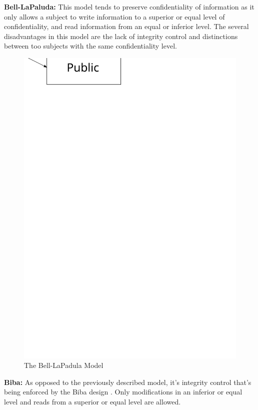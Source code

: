 \documentclass[pdftex,a4paper,titlepage,11pt]{article}
\begin{document}
\textbf{Bell-LaPaluda:} This model \cite{BLP} tends to preserve confidentiality
of
information as it only allows a subject to write information to a superior or
equal level of confidentiality, and read information from an equal or inferior
level. The several disadvantages in this model are the lack of integrity control
and distinctions between too subjects with the same confidentiality level.

\begin{figure}[h]
	\centering
	\includegraphics[scale=0.5]{bell-lp}
	\caption{The Bell-LaPadula Model}
\end{figure}

\bigskip

\textbf{Biba:} As opposed to the previously described model, it's integrity
control that's being enforced by the Biba design \cite{Biba}. Only modifications
in an inferior or equal level and reads from a superior or equal level are
allowed.
\end{document}

